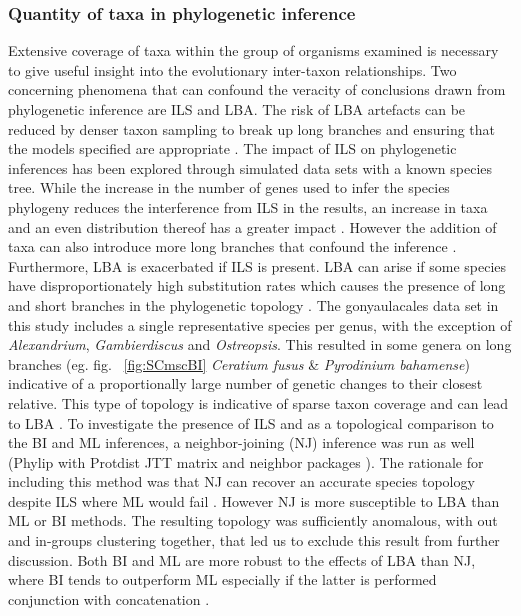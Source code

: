 \documentclass[12pt]{article}
\begin{document}
\subsubsection*{Quantity of taxa in phylogenetic inference}
Extensive coverage of taxa within the group of organisms examined is necessary to give useful insight into the evolutionary inter-taxon relationships.
Two concerning phenomena that can confound the veracity of conclusions drawn from phylogenetic inference are ILS and LBA. 
The risk of LBA artefacts can be reduced by denser taxon sampling to break up long branches and ensuring that the models specified are appropriate \cite{heath2008taxon}. 
The impact of ILS on phylogenetic inferences has been explored through simulated data sets with a known species tree. 
While the increase in the number of genes used to infer the species phylogeny reduces the interference from ILS in the results, an increase in taxa and an even distribution thereof has a greater impact \cite{maddison2006inferring}.
However the addition of taxa can also introduce more long branches that confound the inference \cite{heath2008taxon}. 
Furthermore, LBA is exacerbated if ILS is present. 
LBA can arise if some species have disproportionately high substitution rates which causes the presence of long and short branches in the phylogenetic topology \cite{liu2014coalescent}. 
The gonyaulacales data set in this study includes a single representative species per genus, with the exception of \textit{Alexandrium}, \textit{Gambierdiscus} and \textit{Ostreopsis}. 
This resulted in some genera on long branches (eg. fig. ~\ref{fig:SCmscBI} \textit{Ceratium fusus} \& \textit{Pyrodinium bahamense}) indicative of a proportionally large number of genetic changes to their closest relative.
This type of topology is indicative of sparse taxon coverage and can lead to LBA \cite{heath2008taxon}. 
To investigate the presence of ILS and as a topological comparison to the BI and ML inferences, a neighbor-joining (NJ) inference was run as well (Phylip with Protdist JTT matrix and neighbor packages \cite{felsenstein2005phylip}). 
The rationale for including this method was that NJ can recover an accurate species topology despite ILS where ML would fail  \cite{mendes2017concatenation}.
However NJ is more susceptible to LBA than ML or BI methods. 
The resulting topology was sufficiently anomalous, with out and in-groups clustering together, that led us to exclude this result from further discussion. 
Both BI and ML are more robust to the effects of LBA than NJ, where BI tends to outperform ML especially if the latter is performed conjunction with concatenation \cite{kubatko2007inconsistency,roch2015likelihood}. 
\end{document}
